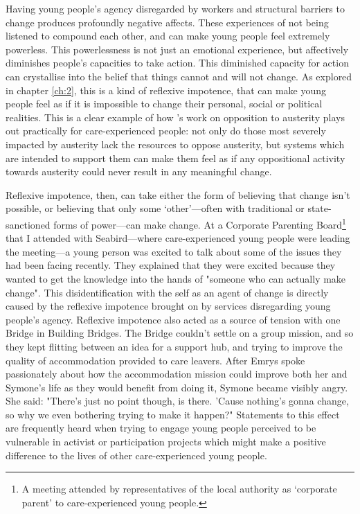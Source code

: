 Having young people's agency disregarded by workers and structural barriers to change produces profoundly negative affects. These experiences of not being listened to compound each other, and can make young people feel extremely powerless. This powerlessness is not just an emotional experience, but affectively diminishes people’s capacities to take action. This diminished capacity for action can crystallise into the belief that things cannot and will not change. As explored in chapter \ref{ch:2}, this is a kind of reflexive impotence, that can make young people feel as if it is impossible to change their personal, social or political realities. This is a clear example of how \citet{harrison_cant_2020}’s work on opposition to austerity plays out practically for care-experienced people: not only do those most severely impacted by austerity lack the resources to oppose austerity, but systems which are intended to support them can make them feel as if any oppositional activity towards austerity could never result in any meaningful change. 

Reflexive impotence, then, can take either the form of believing that change isn’t possible, or believing that only some ‘other’—often with traditional or state-sanctioned forms of power—can make change. At a Corporate Parenting Board\footnote{A meeting attended by representatives of the local authority as `corporate parent’ to care-experienced young people.} that I attended with Seabird—where care-experienced young people were leading the meeting—a young person was excited to talk about some of the issues they had been facing recently. They explained that they were excited because they wanted to get the knowledge into the hands of "someone who can actually make change".  This disidentification with the self as an agent of change is directly caused by the reflexive impotence brought on by services disregarding young people’s agency. Reflexive impotence also acted as a source of tension with one Bridge in Building Bridges. The Bridge couldn’t settle on a  group mission, and so they kept flitting between an idea for a support hub, and trying to improve the quality of accommodation provided to care leavers. After Emrys spoke passionately about how the accommodation mission could improve both her and Symone's life as they would benefit from doing it, Symone became visibly angry. She said: "There's just no point though, is there. 'Cause nothing's gonna change, so why we even bothering trying to make it happen?" Statements to this effect are frequently heard when trying to engage young people perceived to be vulnerable in activist or participation projects which might make a positive difference to the lives of other care-experienced young people. 

